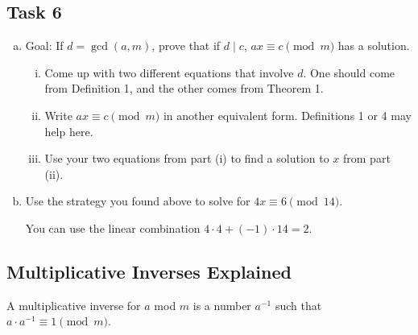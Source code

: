 \documentclass[12pt,letterpaper]{article}
\begin{document}
    \subsection*{Task 6}
	    \begin{enumerate}[a.]
		\item Goal: If $d = \gcd(a, m)$, prove that if $d \mid c$, $ax \equiv c \pmod{m}$ has a solution.
		
		\begin{enumerate}[i.]
		    \item Come up with two different equations that involve $d$. One should come from Definition 1, and the other comes from Theorem 1.
		    \begin{mdframed} \vspace{1cm} \end{mdframed}
		    
		    \item Write $ax \equiv c \pmod m$ in another equivalent form. Definitions 1 or 4 may help here.
		    \begin{mdframed} \vspace{1cm} \end{mdframed}
		    
		    \item Use your two equations from part (i) to find a solution to $x$ from part (ii).
		    \begin{mdframed} \vspace{2cm} \end{mdframed}
		\end{enumerate}
		

		\item Use the strategy you found above to solve for $4x \equiv 6 \pmod{14}$.

        You can use the linear combination $4\cdot 4 + (-1)\cdot 14 = 2$.

		\begin{mdframed} \vspace{6cm} \end{mdframed}
	
	    \end{enumerate}
        
        \pagebreak
        
		\subsection*{Multiplicative Inverses Explained}

		A multiplicative inverse for $a$ mod $m$ is a number $a^{-1}$ such that $a \cdot a^{-1} \equiv 1 \pmod{m}$.
\end{document}
